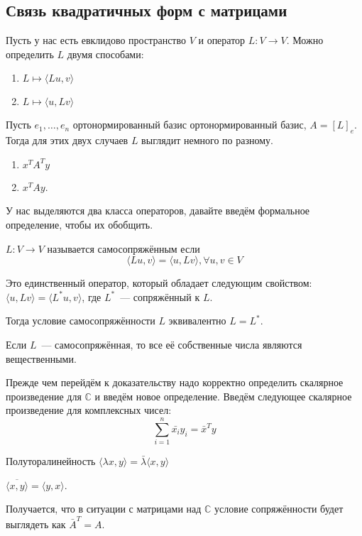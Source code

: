 \subsection{Связь квадратичных форм с матрицами}
Пусть у нас есть евклидово пространство $V$ и оператор 
$L\colon V \to V$. Можно определить $L$  двумя способами:
\begin{enumerate}
    \item $L \mapsto \langle Lu, v \rangle$ 
    \item $L \mapsto \langle u, Lv \rangle$
\end{enumerate}
Пусть $e_1, \dots, e_n$ ортонормированный базис ортонормированный базис,
$A = [L]_e$.
Тогда для этих двух случаев $L$ выглядит немного по разному.
\begin{enumerate}
    \item $x^T A^T y$ 
    \item $x^T A y$.
\end{enumerate}
У нас выделяются два класса операторов, давайте введём формальное определение,
чтобы их обобщить.
\begin{definition}
    $L: V \to V$ называется самосопряжённым если 
    \[
        \langle Lu, v \rangle = \langle u, Lv \rangle, \forall u, v\in V
    \]
\end{definition}
\begin{remark}
    Это единственный оператор, который обладает следующим свойством:
    $\langle u, Lv \rangle = \langle L^* u, v \rangle$, где $L^*$~---
    сопряжённый к $L$.
\end{remark}
\begin{follow}
    Тогда условие самосопряжённости $L$ эквивалентно $L = L^*$.
\end{follow}

\begin{statement}
    Если $L$~--- самосопряжённая, то все её собственные числа являются
    вещественными.
\end{statement}
Прежде чем перейдём к доказательству надо корректно определить 
скалярное произведение для $\mathbb{C}$ и введём новое определение.
Введём следующее скалярное произведение для комплексных чисел:
\[
    \sum\limits_{i=1}^{n}{\bar{x_i}y_i} = \bar{x}^T y
\]

\begin{properties}
     \item Полуторалинейность 
     $\langle \lambda x, y \rangle = \bar{\lambda}\langle x, y \rangle$
     \item
     $\overline{\langle x, y \rangle} = \langle y, x \rangle$.
\end{properties}
Получается, что в ситуации с матрицами над $\mathbb{C}$ условие
сопряжённости будет выглядеть как $\bar{A}^T = A$.

